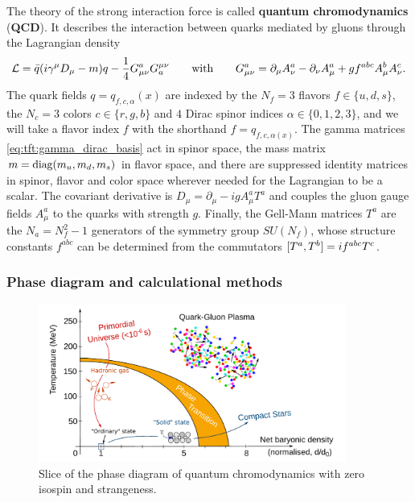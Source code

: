 The theory of the strong interaction force is called \textbf{quantum chromodynamics} (\textbf{QCD}).
It describes the interaction between quarks mediated by gluons through the Lagrangian density
\begin{equation}
	\mathcal{L} = \bar{q} ( i \gamma^\mu D_\mu - m ) q - \frac14 G_{\mu\nu}^a G^{\mu\nu}_a
	\qquad \text{with} \qquad
	G_{\mu\nu}^a = \partial_\mu A_\nu^a - \partial_\nu A_\mu^a + g f^{abc} A_\mu^b A_\nu^c.
\label{eq:qcd:lagrangian}
\end{equation}
The quark fields $q = q_{f,c,\alpha}(x)$ are indexed by
the $N_f = 3$ flavors $f \in \{u,d,s\}$,
the $N_c = 3$ colors $c \in \{r,g,b\}$ and
$4$ Dirac spinor indices $\alpha \in \{0,1,2,3\}$,
and we will take a flavor index $f$ with the shorthand $f = q_{f,c,\alpha(x)}$.
The gamma matrices \eqref{eq:tft:gamma_dirac_basis} act in spinor space,
the mass matrix $m = \operatorname{diag}(m_u, m_d, m_s)$ in flavor space,
and there are suppressed identity matrices in spinor, flavor and color space wherever needed for the Lagrangian to be a scalar.
The covariant derivative is $D_\mu = \partial_\mu - i g A_\mu^a T^a$ and couples the gluon gauge fields $A_\mu^a$ to the quarks with strength $g$.
Finally, the Gell-Mann matrices $T^a$ are the $N_a = N_f^2 - 1$ generators of the symmetry group $SU(N_f)$,
whose structure constants $f^{abc}$ can be determined from the commutators $[ T^a , T^b ] = i f^{abc} T^c$.


\subsubsection{Phase diagram and calculational methods}

\begin{figure}[t]
\centering
\includegraphics[width=0.9\textwidth]{figures/qcd-phase-diagram.pdf}
\caption{%
	Slice of the phase diagram of quantum chromodynamics with zero isospin and strangeness.
}
\label{fig:qcd:phase_diagram}
\end{figure}

